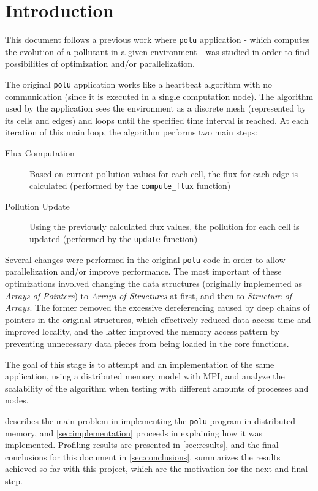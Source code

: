 \section{Introduction}
\label{sec:intro}


This document follows a previous work where \texttt{polu} application - which computes the evolution of a pollutant in a given environment - was studied in order to find possibilities of optimization and/or parallelization.

The original \texttt{polu} application works like a heartbeat algorithm with no communication (since it is executed in a single computation node). The algorithm used by the application sees the environment as a discrete mesh (represented by its cells and edges) and loops until the specified time interval is reached. At each iteration of this main loop, the algorithm performs two main steps:

\begin{description}
	\item[Flux Computation] Based on current pollution values for each cell, the flux for each edge is calculated (performed by the \texttt{compute\_flux} function)
	\item[Pollution Update] Using the previously calculated flux values, the pollution for each cell is updated (performed by the \texttt{update} function)
\end{description}

Several changes were performed in the original \texttt{polu} code in order to allow parallelization and/or improve performance. The most important of these optimizations involved changing the data structures (originally implemented as \textit{Arrays-of-Pointers}) to \textit{Arrays-of-Structures} at first, and then to \textit{Structure-of-Arrays}. The former removed the excessive dereferencing caused by deep chains of pointers in the original structures, which effectively reduced data access time and improved locality, and the latter improved the memory access pattern by preventing unnecessary data pieces from being loaded in the core functions.

The goal of this stage is to attempt and an implementation of the same application, using a distributed memory model with MPI, and analyze the scalability of the algorithm when testing with different amounts of processes and nodes.

 describes the main problem in implementing the \texttt{polu} program in distributed memory, and \cref{sec:implementation} proceeds in explaining how it was implemented. Profiling results are presented in \cref{sec:results}, and the final conclusions for this document in \cref{sec:conclusions}.  summarizes the results achieved so far with this project, which are the motivation for the next and final step.
